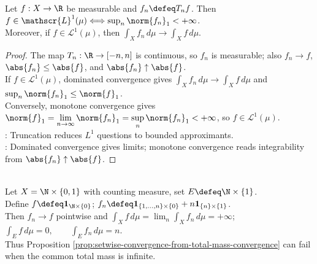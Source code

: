 \begin{proposition} \label{prop:truncation-characterization-integrability} \\
Let $f:X\to\R$ be measurable and $f_n\defeq T_nf$. Then $f\in\mathscr{L}^1(\mu)\Longleftrightarrow \sup_n\norm{f_n}_1<+\infty$.\\
Moreover, if $f\in\mathscr{L}^1(\mu)$, then $\int_Xf_n\,d\mu\to\int_Xf\,d\mu$.
\begin{proof}
The map $T_n:\R\to[-n,n]$ is continuous, so $f_n$ is measurable; also $f_n\to f$, $\abs{f_n}\leq\abs{f}$, and $\abs{f_n}\uparrow\abs{f}$.\\
If $f\in\mathscr{L}^1(\mu)$, dominated convergence gives $\int_Xf_n\,d\mu\to\int_Xf\,d\mu$ and $\sup_n\norm{f_n}_1\leq\norm{f}_1$.\\
Conversely, monotone convergence gives $\norm{f}_1=\lim\limits_{n\to\infty}\norm{f_n}_1=\sup\limits_n\norm{f_n}_1<+\infty$, so $f\in\mathscr{L}^1(\mu)$.\\
: Truncation reduces $L^1$ questions to bounded approximants.\\
: Dominated convergence gives limits; monotone convergence reads integrability from $\abs{f_n}\uparrow\abs{f}$.
\end{proof}
\end{proposition}

\begin{example} \label{ex:setwise-convergence-needs-finite-total-mass} \\
Let $X=\N\times\{0,1\}$ with counting measure, set $E\defeq\N\times\{1\}$.\\
Define $f\defeq\mathbf{1}_{\N\times\{0\}}$; $f_n\defeq\mathbf{1}_{\{1,\ldots,n\}\times\{0\}}+n\mathbf{1}_{\{n\}\times\{1\}}$.\\
Then $f_n\to f$ pointwise and $\int_Xf\,d\mu=\lim_n\int_Xf_n\,d\mu=+\infty$; $\int_Ef\,d\mu=0,\qquad \int_Ef_n\,d\mu=n$.\\
Thus Proposition \ref{prop:setwise-convergence-from-total-mass-convergence} can fail when the common total mass is infinite.
\end{example}
